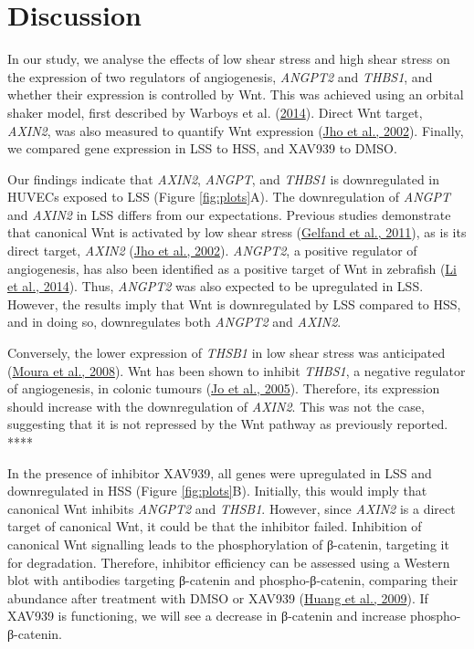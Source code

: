 \documentclass[
  11pt,
]{article}
\begin{document}
\hypertarget{discussion}{%
\section{Discussion}\label{discussion}}

In our study, we analyse the effects of low shear stress and high shear stress on the expression of two regulators of angiogenesis, \emph{ANGPT2} and \emph{THBS1}, and whether their expression is controlled by Wnt.
This was achieved using an orbital shaker model, first described by Warboys et al. (\protect\hyperlink{ref-Warboys2014}{2014}).
Direct Wnt target, \emph{AXIN2}, was also measured to quantify Wnt expression (\protect\hyperlink{ref-Jho2002}{Jho et al., 2002}).
Finally, we compared gene expression in LSS to HSS, and XAV939 to DMSO.

Our findings indicate that \emph{AXIN2}, \emph{ANGPT}, and \emph{THBS1} is downregulated in HUVECs exposed to LSS (Figure \ref{fig:plots}A).
The downregulation of \emph{ANGPT} and \emph{AXIN2} in LSS differs from our expectations.
Previous studies demonstrate that canonical Wnt is activated by low shear stress (\protect\hyperlink{ref-Gelfand2011}{Gelfand et al., 2011}), as is its direct target, \emph{AXIN2} (\protect\hyperlink{ref-Jho2002}{Jho et al., 2002}).
\emph{ANGPT2}, a positive regulator of angiogenesis, has also been identified as a positive target of Wnt in zebrafish (\protect\hyperlink{ref-Li2014-mx}{Li et al., 2014}).
Thus, \emph{ANGPT2} was also expected to be upregulated in LSS.
However, the results imply that Wnt is downregulated by LSS compared to HSS, and in doing so, downregulates both \emph{ANGPT2} and \emph{AXIN2}.

Conversely, the lower expression of \emph{THSB1} in low shear stress was anticipated (\protect\hyperlink{ref-Moura2008}{Moura et al., 2008}).
Wnt has been shown to inhibit \emph{THBS1}, a negative regulator of angiogenesis, in colonic tumours (\protect\hyperlink{ref-jo2005}{Jo et al., 2005}).
Therefore, its expression should increase with the downregulation of \emph{AXIN2}.
This was not the case, suggesting that it is not repressed by the Wnt pathway as previously reported.
****

In the presence of inhibitor XAV939, all genes were upregulated in LSS and downregulated in HSS (Figure \ref{fig:plots}B).
Initially, this would imply that canonical Wnt inhibits \emph{ANGPT2} and \emph{THSB1}.
However, since \emph{AXIN2} is a direct target of canonical Wnt, it could be that the inhibitor failed.
Inhibition of canonical Wnt signalling leads to the phosphorylation of β-catenin, targeting it for degradation.
Therefore, inhibitor efficiency can be assessed using a Western blot with antibodies targeting β-catenin and phospho-β-catenin, comparing their abundance after treatment with DMSO or XAV939 (\protect\hyperlink{ref-Huang2009}{Huang et al., 2009}).
If XAV939 is functioning, we will see a decrease in β-catenin and increase phospho-β-catenin.
\end{document}
